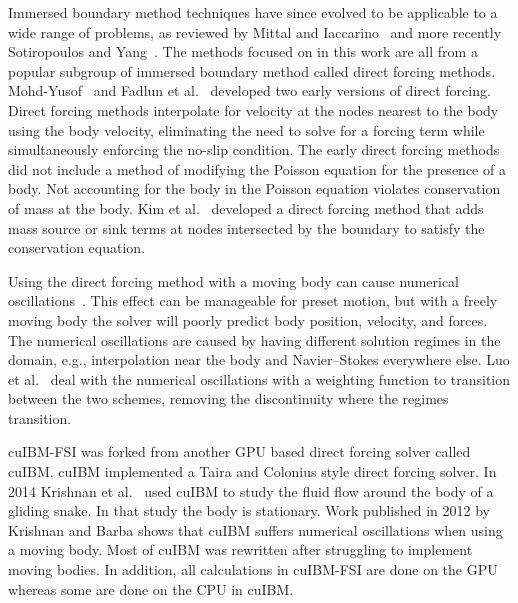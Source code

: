 Immersed boundary method techniques have since evolved to be applicable to a wide range of problems, as reviewed by Mittal and Iaccarino~\cite{Mittal:2005ii} and more recently Sotiropoulos and Yang~\cite{Sotiropoulos:2014gv}. 
The methods focused on in this work are all from a popular subgroup of immersed boundary method called direct forcing methods. 
Mohd-Yusof~\cite{MohdYusof:1997wh} and Fadlun et al.~\cite{Fadlun:2000fl} developed two early versions of direct forcing. 
Direct forcing methods interpolate for velocity at the nodes nearest to the body using the body velocity, eliminating the need to solve for a forcing term while simultaneously enforcing the no-slip condition.
The early direct forcing methods did not include a method of modifying the Poisson equation for the presence of a body. 
Not accounting for the body in the Poisson equation violates conservation of mass at the body. 
Kim et al.~\cite{kim2001immersed} developed a direct forcing method that adds mass source or sink terms at nodes intersected by the boundary to satisfy the conservation equation. 

Using the direct forcing method with a moving body can cause numerical oscillations~\cite{liao2010simulating,Luo:2012gx}.
This effect can be manageable for preset motion, but with a freely moving body the solver will poorly predict body position, velocity, and forces. 
The numerical oscillations are caused by having different solution regimes in the domain, e.g., interpolation near the body and Navier--Stokes everywhere else. 
Luo et al.~\cite{Luo:2012gx} deal with the numerical oscillations with a weighting function to transition between the two schemes, removing the discontinuity where the regimes transition. 

cuIBM-FSI was forked from another GPU based direct forcing solver called cuIBM\cite{layton2011cuibm}. 
cuIBM implemented a Taira and Colonius\cite{Taira:2007jl} style direct forcing solver. 
In 2014 Krishnan et al.~\cite{krishnan2014lift} used cuIBM to study the fluid flow around the body of a gliding snake. 
In that study the body is stationary. 
Work published in 2012 by Krishnan and  Barba\cite{krishnan2012validation} shows that cuIBM suffers numerical oscillations when using a moving body. 
Most of cuIBM was rewritten after struggling to implement moving bodies. 
In addition, all calculations in cuIBM-FSI are done on the GPU whereas some are done on the CPU in cuIBM.

